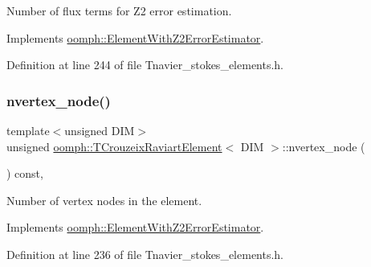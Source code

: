 Number of \textquotesingle{}flux\textquotesingle{} terms for Z2 error estimation. 



Implements \hyperlink{classoomph_1_1ElementWithZ2ErrorEstimator_ae82c5728902e13da31be19c390fc28e3}{oomph\+::\+Element\+With\+Z2\+Error\+Estimator}.



Definition at line 244 of file Tnavier\+\_\+stokes\+\_\+elements.\+h.

\mbox{\label{classoomph_1_1TCrouzeixRaviartElement_a7d150a3bf2b048eb4fc99222822301b0}} 
\subsubsection{\texorpdfstring{nvertex\+\_\+node()}{nvertex\_node()}}
{\footnotesize\ttfamily template$<$unsigned D\+IM$>$ \\
unsigned \hyperlink{classoomph_1_1TCrouzeixRaviartElement}{oomph\+::\+T\+Crouzeix\+Raviart\+Element}$<$ D\+IM $>$\+::nvertex\+\_\+node (\begin{DoxyParamCaption}{ }\end{DoxyParamCaption}) const\hspace{0.3cm}{\ttfamily [inline]}, {\ttfamily [virtual]}}



Number of vertex nodes in the element. 



Implements \hyperlink{classoomph_1_1ElementWithZ2ErrorEstimator_a19495a0e77ef4ff35f15fdf7913b4077}{oomph\+::\+Element\+With\+Z2\+Error\+Estimator}.



Definition at line 236 of file Tnavier\+\_\+stokes\+\_\+elements.\+h.

\mbox{\label{classoomph_1_1TCrouzeixRaviartElement_a9d8ebc6516e9c98a4fefdea2a821356d}} 
